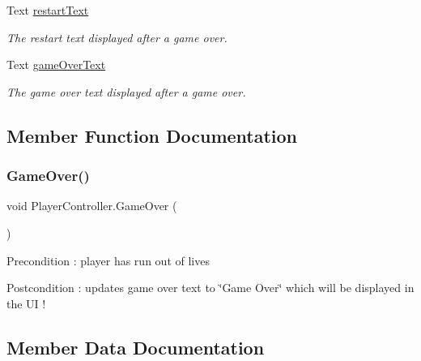 \begin{DoxyCompactItemize}
Text \mbox{\hyperlink{class_player_controller_a5dacc07bd5240b4d30337caeb89d6e02}{restart\+Text}}
\begin{DoxyCompactList}\small\item\em The restart text displayed after a game over. \end{DoxyCompactList}\item 
\mbox{\label{class_player_controller_ad22c814018c51eab731676920276c38d}} 
Text \mbox{\hyperlink{class_player_controller_ad22c814018c51eab731676920276c38d}{game\+Over\+Text}}
\begin{DoxyCompactList}\small\item\em The game over text displayed after a game over. \end{DoxyCompactList}\end{DoxyCompactItemize}


\subsection{Member Function Documentation}
\mbox{\label{class_player_controller_a022c877a529497a8fdb3fcf7e21cf090}} 
\subsubsection{\texorpdfstring{GameOver()}{GameOver()}}
{\footnotesize\ttfamily void Player\+Controller.\+Game\+Over (\begin{DoxyParamCaption}{ }\end{DoxyParamCaption})}

\begin{DoxyPrecond}{Precondition}
\+: player has run out of lives 
\end{DoxyPrecond}
\begin{DoxyPostcond}{Postcondition}
\+: updates game over text to \char`\"{}\+Game Over\char`\"{} which will be displayed in the UI ! 
\end{DoxyPostcond}


\subsection{Member Data Documentation}
\mbox{\label{class_player_controller_aec1e8f25c69ea198fe38f965307437a4}} 
